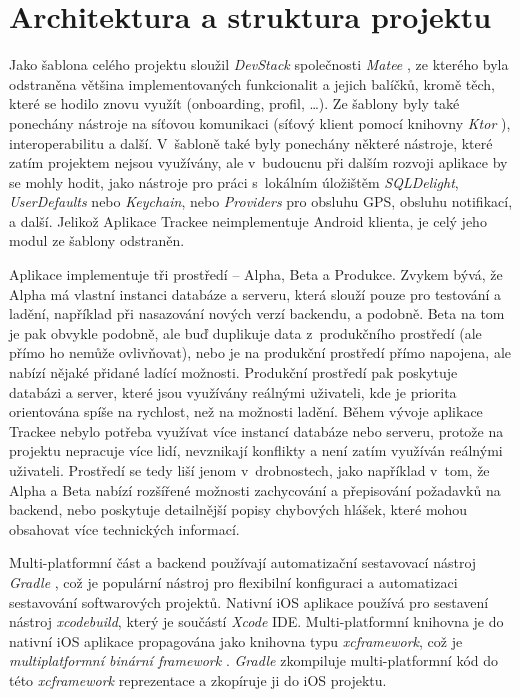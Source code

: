 \section{Architektura a struktura projektu}\label{project-structure}

Jako šablona celého projektu sloužil \emph{DevStack} společnosti \emph{Matee} \cite{matee-devstack}, ze kterého byla odstraněna většina implementovaných funkcionalit a jejich balíčků, kromě těch, které se hodilo znovu využít (onboarding, profil, \dots). Ze šablony byly také ponechány nástroje na síťovou komunikaci (síťový klient pomocí knihovny \emph{Ktor} \cite{ktor}), interoperabilitu a další. V~šabloně také byly ponechány některé nástroje, které zatím projektem nejsou využívány, ale v~budoucnu při dalším rozvoji aplikace by se mohly hodit, jako nástroje pro práci s~lokálním úložištěm \emph{SQLDelight}, \emph{UserDefaults} nebo \emph{Keychain}, nebo \emph{Providers} pro obsluhu GPS, obsluhu notifikací, a další. Jelikož Aplikace Trackee neimplementuje Android klienta, je celý jeho modul ze šablony odstraněn.

Aplikace implementuje tři prostředí – Alpha, Beta a Produkce. Zvykem bývá, že Alpha má vlastní instanci databáze a serveru, která slouží pouze pro testování a ladění, například při nasazování nových verzí backendu, a podobně. Beta na tom je pak obvykle podobně, ale buď duplikuje data z~produkčního prostředí (ale přímo ho nemůže ovlivňovat), nebo je na produkční prostředí přímo napojena, ale nabízí nějaké přidané ladící možnosti. Produkční prostředí pak poskytuje databázi a server, které jsou využívány reálnými uživateli, kde je priorita orientována spíše na rychlost, než na možnosti ladění. Během vývoje aplikace Trackee nebylo potřeba využívat více instancí databáze nebo serveru, protože na projektu nepracuje více lidí, nevznikají konflikty a není zatím využíván reálnými uživateli. Prostředí se tedy liší jenom v~drobnostech, jako například v~tom, že Alpha a Beta nabízí rozšířené možnosti zachycování a přepisování požadavků na backend, nebo poskytuje detailnější popisy chybových hlášek, které mohou obsahovat více technických informací. 

Multi-platformní část a backend používají automatizační sestavovací nástroj \emph{Gradle} \cite{gradle}, což je populární nástroj pro flexibilní konfiguraci a automatizaci sestavování softwarových projektů. Nativní iOS aplikace používá pro sestavení nástroj \emph{xcodebuild}, který je součástí \emph{Xcode} IDE. Multi-platformní knihovna je do nativní iOS aplikace propagována jako knihovna typu \emph{xcframework}, což je \emph{multiplatformní binární framework} \cite{xcframework}. \emph{Gradle} zkompiluje multi-platformní kód do této \emph{xcframework} reprezentace a zkopíruje ji do iOS projektu.

